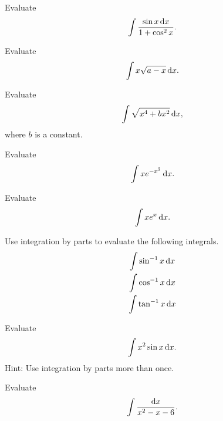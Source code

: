 \begin{hwsection}
\begin{hw}
Evaluate
\begin{equation*}
  \int \frac{\sin x \operatorname{d\!} x}{1+\cos^2 x}.
\end{equation*}
\end{hw}

\begin{hw}
Evaluate
\begin{equation*}
  \int x\sqrt{a-x}\operatorname{d\!} x.
\end{equation*}
\end{hw}

\begin{hw}
Evaluate
\begin{equation*}
  \int \sqrt{x^4+bx^2} \operatorname{d\!} x,
\end{equation*}
where $b$ is a constant.
\end{hw}

\begin{hw}
Evaluate
\begin{equation*}
  \int x e^{-x^2} \operatorname{d\!} x.
\end{equation*}
\end{hw}

\begin{hw}
Evaluate
\begin{equation*}
  \int x e^x \operatorname{d\!} x.
\end{equation*}
\end{hw}

\begin{hw}
Use integration by parts to evaluate the following integrals.
\begin{gather*}
  \int \sin^{-1} x\operatorname{d\!} x \\
  \int \cos^{-1} x\operatorname{d\!} x \\
  \int \tan^{-1} x\operatorname{d\!} x 
\end{gather*}
\end{hw}

\begin{hw}
Evaluate
\begin{equation*}
  \int x^2 \sin x \operatorname{d\!} x.
\end{equation*}
Hint: Use integration by parts more than once.
\end{hw}

\begin{hw}
Evaluate
\begin{equation*}
  \int \frac{\operatorname{d\!} x}{x^2-x-6}.
\end{equation*}
\end{hw}


\end{hwsection}
